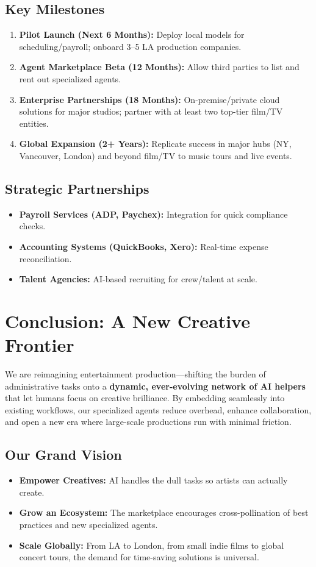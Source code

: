 \documentclass[11pt]{article}
\begin{document}
\subsection{Key Milestones}
\begin{enumerate}
    \item \textbf{Pilot Launch (Next 6 Months):} Deploy local models for scheduling/payroll; onboard 3--5 LA production companies.
    \item \textbf{Agent Marketplace Beta (12 Months):} Allow third parties to list and rent out specialized agents.
    \item \textbf{Enterprise Partnerships (18 Months):} On-premise/private cloud solutions for major studios; partner with at least two top-tier film/TV entities.
    \item \textbf{Global Expansion (2+ Years):} Replicate success in major hubs (NY, Vancouver, London) and beyond film/TV to music tours and live events.
\end{enumerate}

\subsection{Strategic Partnerships}
\begin{itemize}
    \item \textbf{Payroll Services (ADP, Paychex):} Integration for quick compliance checks.
    \item \textbf{Accounting Systems (QuickBooks, Xero):} Real-time expense reconciliation.
    \item \textbf{Talent Agencies:} AI-based recruiting for crew/talent at scale.
\end{itemize}

\section{Conclusion: A New Creative Frontier}

We are reimagining entertainment production—shifting the burden of administrative tasks onto a \textbf{dynamic, ever-evolving network of AI helpers} that let humans focus on creative brilliance. By embedding seamlessly into existing workflows, our specialized agents reduce overhead, enhance collaboration, and open a new era where large-scale productions run with minimal friction.

\subsection{Our Grand Vision}
\begin{itemize}
    \item \textbf{Empower Creatives:} AI handles the dull tasks so artists can actually create.
    \item \textbf{Grow an Ecosystem:} The marketplace encourages cross-pollination of best practices and new specialized agents.
    \item \textbf{Scale Globally:} From LA to London, from small indie films to global concert tours, the demand for time-saving solutions is universal.
\end{itemize}
\end{document}

